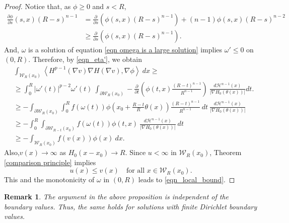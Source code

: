 \documentclass[11pt]{amsart}
\newtheorem{remark}{Remark}
\newcommand{\Fin}[1]{H^{p-1}(\nabla #1)\nabla H(\nabla #1)}
\numberwithin{equation}{section}
\begin{document}
\begin{proof}
    Notice that, as $\phi\geq 0$ and $s<R$, 
    \begin{equation*}
    \begin{split}
        \frac{\partial \phi}{\partial s}(s,x) (R-s)^{n-1}&=\frac{\partial}{\partial s}\left(\phi(s,x)(R-s)^{n-1}\right)+(n-1)\phi(s,x)(R-s)^{n-2}\\
        &\geq \frac{\partial}{\partial s}\left(\phi(s,x)(R-s)^{n-1}\right).
        \end{split}
    \end{equation*}
    And, $\omega$ is a solution of equation \eqref{eqn omega is a large solution} implies $\omega'\leq 0$ on $(0,R)$. Therefore, by \eqref{eqn_eta'}, we obtain  
    \begin{equation*}
        \begin{split}
            &\int_{\mathcal{W}_{R}(x_{0})}\left<\Fin{v}, \nabla\phi \right>\ dx\geq \\
            &\geq \int_{0}^{R}|\omega'(t)|^{p-2}\omega'(t)~ \int_{\partial \mathcal{W}_{R}(x_{0})}-\frac{\partial }{\partial t}\left(\phi(t,x) \frac{(R-t)^{n-1}}{R^{n-1}}\right) \ \frac{d\mathcal{H}^{n-1}(x)}{|\nabla H_{0}(\theta(x))|} dt.\\
            &\geq -\int_{\partial \mathcal{W}_{R}(x_{0})}\int_{0}^{R}f(\omega(t))\phi\left(x_{0}+\frac{R-t}{R}\theta(x)\right)\frac{(R-t)^{n-1}}{R^{n-1}}\ dt \ \frac{d\mathcal{H}^{n-1}(x)}{|\nabla H_{0}(\theta(x))|}\\
            &\geq -\int_{0}^{R} \int_{\partial \mathcal{W}_{R-t}(x_{0})}f(\omega(t))\phi(t,x)\ \frac{d\mathcal{H}^{n-1}(x)}{|\nabla H_{0}(\theta(x))|}\ dt\\
            &\geq -\int_{\mathcal{W}_{R}(x_{0})}f(v(x))\phi(x)\ dx.
        \end{split}
    \end{equation*}
    Also,$v(x)\to \infty$ as $H_{0}(x-x_{0})\to R$.
Since $u<\infty$ in $\mathcal{W}_{R}(x_{0})$, Theorem \ref{comparison principle} implies 
    \begin{equation*}
        u(x)\leq v(x)\quad \text{for all }x\in \mathcal{W}_{R}(x_{0}).
    \end{equation*}
    This and the monotonicity of $\omega$ in $(0,R)$ leads to \eqref{eqn_local_bound}. 
 \end{proof}
 \begin{remark}
     The argument in the above proposition is independent of the boundary values. Thus, the same holds for solutions with finite Dirichlet boundary values. 
 \end{remark}
\end{document}
